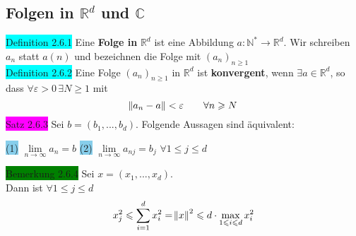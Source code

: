 \documentclass[landscape, 10pt]{article}
\newcommand{\R}{\mathbb{R}}
\newcommand{\N}{\mathbb{N}}
\newcommand{\C}{\mathbb{C}}
\begin{document}
\begin{multicols}{3}
       \subsection{Folgen in $\R^d$ und $\C$}
              \colorbox{cyan}{Definition 2.6.1} 
                     Eine \textbf{Folge in} 
                     \textcolor{NavyBlue}{$\R^d$} 
                     ist eine Abbildung 
                     \textcolor{NavyBlue}{
                     $a:\N^*\longrightarrow\R^d$}. 
                     Wir schreiben $a_n$ statt $a(n)$ 
                     und bezeichnen die Folge mit 
                     \textcolor{NavyBlue}{
                     $(a_n)_{n\geqslant1}$}\\
              \colorbox{cyan}{Definition 2.6.2} 
                     Eine Folge $(a_n)_{n\geqslant1}$ in $\R^d$ 
                     ist \textbf{konvergent}, wenn 
                     \textcolor{NavyBlue}{$\exists a\in\R^d$}, 
                     so dass
                     \textcolor{NavyBlue}{
                     $\forall\varepsilon >0\,\exists N\geqslant1$} 
                     mit 
                     \begin{equation*}
                            \norm{a_n-a}<\varepsilon
                            \qquad\forall n\geqslant N
                     \end{equation*}
              \colorbox{magenta}{Satz 2.6.3} 
                     Sei \textcolor{NavyBlue}{$b=(b_1,...,b_d)$}. 
                     Folgende Aussagen sind äquivalent:
                     \begin{multicols}{2}
                     \colorbox{SkyBlue}{(1)} 
                           \textcolor{NavyBlue}{$\lim\limits_{n\to\infty}a_n=b$}
                     \colorbox{SkyBlue}{(2)} 
                            \textcolor{NavyBlue}{
                            $\lim\limits_{n\to\infty}a_{nj}=b_j$\quad
                            $\forall 1\leqslant j\leqslant d$}
                     \end{multicols}
              \colorbox{green}{Bemerkung 2.6.4} 
                     Sei \textcolor{NavyBlue}{$x=(x_1,...,x_d)$}. \\
                     Dann ist 
                     \textcolor{NavyBlue}{
                     $\forall 1\leqslant j\leqslant d$}
                     \begin{align*}
                            x^2_j\leqslant\sum_{i=1}^{d}x_i^2=\norm{x}^2\leqslant 
                            d\cdot \max\limits_{1\leqslant i\leqslant d}x_i^2
                     \end{align*}

\end{multicols}
\end{document}

